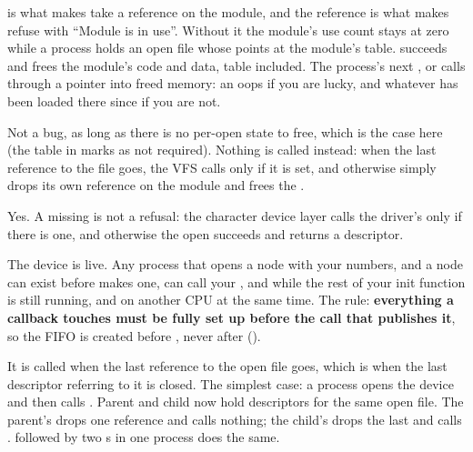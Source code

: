 
  is what makes  take a reference on the module, and the reference
is what makes  refuse with ``Module is in use''. Without it the module's use count stays
at zero while a process holds an open file whose  points at the module's
 table.  succeeds and frees the module's code and data, table
included. The process's next ,  or  calls through a pointer into
freed memory: an oops if you are lucky, and whatever has been loaded there since if you are not.

 Not a bug, as long as there is no per-open state to free, which is the case here (the
table in  marks  as not required). Nothing is called instead:
when the last reference to the file goes, the VFS calls  only if it is set, and
otherwise simply drops its own reference on the module and frees the .

 Yes. A missing  is not a refusal: the character device layer calls the
driver's  only if there is one, and otherwise the open succeeds and returns a
descriptor.

 The device is live. Any process that opens a node with your numbers, and a node can exist
before  makes one, can call your ,  and 
while the rest of your init function is still running, and on another CPU at the same time. The
rule: \textbf{everything a callback touches must be fully set up before the call that publishes it},
so the FIFO is created before , never after ().

 It is called when the last reference to the open file goes, which is when the last
descriptor referring to it is closed. The simplest case: a process opens the device and then calls
. Parent and child now hold descriptors for the same open file. The parent's
 drops one reference and calls nothing; the child's  drops the last and
calls .  followed by two s in one process does the same.


